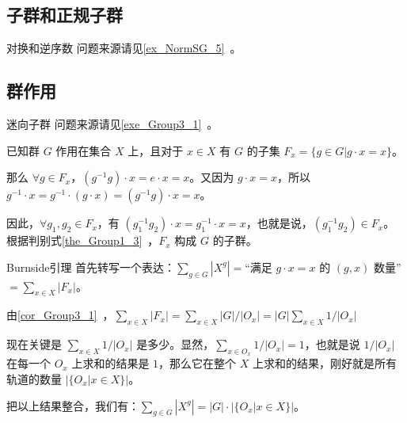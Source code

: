 
\subsection{子群和正规子群}

\begin{example}{对换和逆序数}\label{ex_GroupP_1}
问题来源请见\autoref{ex_NormSG_5}~。



\end{example}

\subsection{群作用}

\begin{example}{迷向子群}\label{ex_GroupP_2}
问题来源请见\autoref{exe_Group3_1}~。

已知群 $G$ 作用在集合 $X$ 上，且对于 $x\in X$ 有 $G$ 的子集 $F_x=\{g\in G|g\cdot x=x\}$。

那么 $\forall g\in F_x$，$(g^{-1}g)\cdot x=e\cdot x=x$。又因为 $g\cdot x=x$，所以 $g^{-1}\cdot x=g^{-1}\cdot(g\cdot x)=(g^{-1}g)\cdot x=x$。

因此，$\forall g_1, g_2\in F_x$，有 $(g_1^{-1}g_2)\cdot x=g_1^{-1}\cdot x=x$，也就是说，$(g_1^{-1}g_2)\in F_x$。根据判别式\autoref{the_Group1_3}~，$F_x$ 构成 $G$ 的子群。




\end{example}

\begin{example}{Burnside引理}\label{ex_GroupP_3}
首先转写一个表达：$\sum_{g\in G}|X^g|=$“满足 $g\cdot x=x$ 的 $(g, x)$ 数量”$=\sum_{x\in X}|F_x|$。

由\autoref{cor_Group3_1}~，$\sum_{x\in X}|F_x|=\sum_{x\in X} |G|/|O_x|=|G| \sum_{x\in X} 1/|O_x|$

现在关键是 $\sum_{x\in X} 1/|O_x|$ 是多少。显然，$\sum_{x\in O_x} 1/|O_x|=1$，也就是说 $1/|O_x|$ 在每一个 $O_x$ 上求和的结果是 $1$，那么它在整个 $X$ 上求和的结果，刚好就是所有轨道的数量 $|\{O_x|x\in X\}|$。

把以上结果整合，我们有：$\sum_{g\in G}|X^g|=|G|\cdot|\{O_x|x\in X\}|$。
\end{example}

